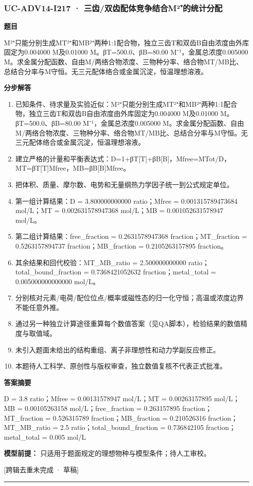 \documentclass[UTF8,11pt,a4paper]{ctexart}
\begin{document}
\subsubsection*{UC-ADV14-I217 · 三齿/双齿配体竞争结合M²⁺的统计分配}
\noindent\textbf{题目}\par
M²⁺只能分别生成MT²⁺和MB²⁺两种1:1配合物，独立三齿T和双齿B自由浓度由外库固定为0.004000 M及0.01000 M。βT=500.0、βB=80.00 M⁻¹，金属总浓度0.005000 M。求金属分配函数、自由M/两络合物浓度、三物种分率、络合物MT/MB比、总结合分率与M守恒。无三元配体络合或金属沉淀，恒温理想溶液。\par
\medskip\noindent\textbf{分步解答}
\begin{enumerate}
\item 已知条件、待求量及实验近似：M²⁺只能分别生成MT²⁺和MB²⁺两种1:1配合物，独立三齿T和双齿B自由浓度由外库固定为0.004000 M及0.01000 M。βT=500.0、βB=80.00 M⁻¹，金属总浓度0.005000 M。求金属分配函数、自由M/两络合物浓度、三物种分率、络合物MT/MB比、总结合分率与M守恒。无三元配体络合或金属沉淀，恒温理想溶液。
\item 建立严格的计量和平衡表达式：D=1+βT[T]+βB[B]，Mfree=MTot/D，MT=βT[T]Mfree，MB=βB[B]Mfree。
\item 把体积、质量、摩尔数、电势和无量纲热力学因子统一到公式规定单位。
\item 第一组计算结果：D = 3.800000000000 ratio；Mfree = 0.001315789473684 mol/L；MT = 0.002631578947368 mol/L；MB = 0.001052631578947 mol/L。
\item 第二组计算结果：free\_fraction = 0.2631578947368 fraction；MT\_fraction = 0.5263157894737 fraction；MB\_fraction = 0.2105263157895 fraction。
\item 其余结果和回代校验：MT\_MB\_ratio = 2.500000000000 ratio；total\_bound\_fraction = 0.7368421052632 fraction；metal\_total = 0.005000000000000 mol/L。
\item 分别核对元素/电荷/配位位点/概率或磁性态的归一化守恒；高温或浓度边界不能任意外推。
\item 通过另一种独立计算途径重算每个数值答案（见QA脚本），检验结果的数值精度与取值域。
\item 未引入题面未给出的结构重组、离子非理想性和动力学副反应修正。
\item 本题待人工科学、原创性与版权审查，独立数值复核不代表正式批准。
\end{enumerate}
\noindent\textbf{答案摘要}\par
D = 3.8 ratio；Mfree = 0.00131578947 mol/L；MT = 0.00263157895 mol/L；MB = 0.00105263158 mol/L；free\_fraction = 0.263157895 fraction；MT\_fraction = 0.526315789 fraction；MB\_fraction = 0.210526316 fraction；MT\_MB\_ratio = 2.5 ratio；total\_bound\_fraction = 0.736842105 fraction；metal\_total = 0.005 mol/L\par
\noindent\textbf{模型前提：}
只适用于题面规定的理想物种与模型条件；待人工审校。\par
\noindent\textcolor{red!65!black}{[跨辑去重未完成 · 草稿]} \par
\medskip\hrule\medskip
{}
\end{document}
